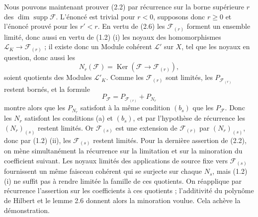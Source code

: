 Nous pouvons maintenant prouver (2.2) par récurrence sur la borne supérieure
$r$ des $\dim\operatorname{supp}\mathcal F$. L'énoncé est trivial pour $r<0$,
supposons donc $r\geq0$ et l'énoncé prouvé pour les $r'<r$. En vertu de (2.6)
les $\mathcal F_{(r)}$ forment un ensemble limité, donc aussi en vertu de (1.2)
(i) les noyaux des homomorphismes
$\mathcal L_K\longrightarrow\mathcal F_{(r)}$ ; il existe donc un Module
cohérent $\mathcal L'$ sur $X$, tel que les noyaux en question, donc aussi les
\[
N_r(\mathcal F)=\operatorname{Ker}(\mathcal F\longrightarrow\mathcal F_{(r)}),
\]
soient quotients des Modules $\mathcal L'_K$. Comme les $\mathcal F_{(r)}$ sont
limités, les $P_{\mathcal F_{(r)}}$ restent bornés, et la formule
\[
P_{\mathcal F}=P_{\mathcal F_{(r)}}+P_{N_r}
\]
montre alors que les $P_{N_r}$ satisfont à la même condition $(b_s)$ que les
$P_{\mathcal F}$. Donc les $N_r$ satisfont les conditions (a) et $(b_s)$, et
par l'hypothèse de récurrence les $(N_r)_{(s)}$ restent limités. Or
$\mathcal F_{(s)}$ est une extension de $\mathcal F_{(r)}$ par
$(N_r)_{(s)}$, donc par (1.2) (ii), les $\mathcal F_{(s)}$ restent limités.
Pour la dernière assertion de (2.2), on mène simultanément la récurrence sur la limitation et sur la minoration du coefficient suivant. Les noyaux limités des applications de source fixe vers $\mathcal F_{(s)}$ fournissent un même faisceau cohérent qui se surjecte sur chaque $N_s$, mais (1.2) (i) ne suffit pas à rendre limitée la famille de ces quotients. On réapplique par récurrence l'assertion sur les coefficients à ces quotients ; l'additivité du polynôme de Hilbert et le lemme 2.6 donnent alors la minoration voulue.
Cela achève la démonstration.


